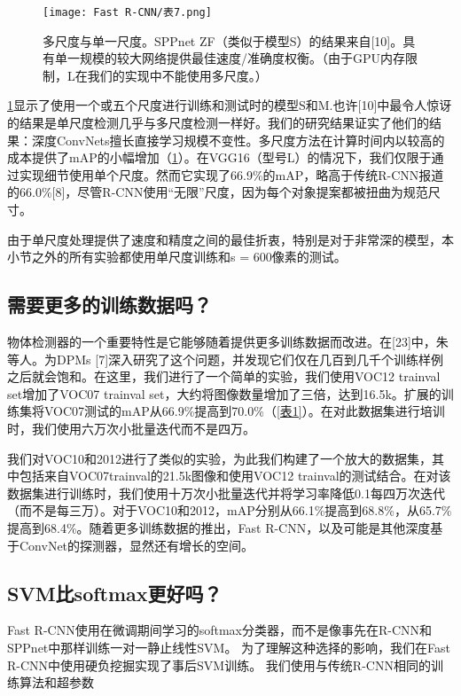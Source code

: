 \begin{figure}[h]
    \centering
    \texttt{[image: Fast R-CNN/表7.png]}
    \caption{多尺度与单一尺度。SPPnet ZF（类似于模型S）的结果来自[10]。具有单一规模的较大网络提供最佳速度/准确度权衡。（由于GPU内存限制，L在我们的实现中不能使用多尺度。）}
    \label{表7}
\end{figure}
\par \ref{表7}显示了使用一个或五个尺度进行训练和测试时的模型S和M.也许[10]中最令人惊讶的结果是单尺度检测几乎与多尺度检测一样好。我们的研究结果证实了他们的结果：深度ConvNets擅长直接学习规模不变性。多尺度方法在计算时间内以较高的成本提供了mAP的小幅增加（\ref{表7}）。在VGG16（型号L）的情况下，我们仅限于通过实现细节使用单个尺度。然而它实现了66.9\%的mAP，略高于传统R-CNN报道的66.0\%[8]，尽管R-CNN使用“无限”尺度，因为每个对象提案都被扭曲为规范尺寸。
\par 由于单尺度处理提供了速度和精度之间的最佳折衷，特别是对于非常深的模型，本小节之外的所有实验都使用单尺度训练和s = 600像素的测试。

\subsection{需要更多的训练数据吗？}
\par 物体检测器的一个重要特性是它能够随着提供更多训练数据而改进。在[23]中，朱等人。为DPMs [7]深入研究了这个问题，并发现它们仅在几百到几千个训练样例之后就会饱和。在这里，我们进行了一个简单的实验，我们使用VOC12 trainval set增加了VOC07 ​​trainval set，大约将图像数量增加了三倍，达到16.5k。扩展的训练集将VOC07测试的mAP从66.9\%提高到70.0\%（\ref{表1}）。在对此数据集进行培训时，我们使用六万次小批量迭代而不是四万。
\par 我们对VOC10和2012进行了类似的实验，为此我们构建了一个放大的数据集，其中包括来自VOC07 ​​trainval的21.5k图像和使用VOC12 trainval的测试结合。在对该数据集进行训练时，我们使用十万次小批量迭代并将学习率降低0.1每四万次迭代（而不是每三万）。对于VOC10和2012，mAP分别从66.1\%提高到68.8\%，从65.7\%提高到68.4\%。随着更多训练数据的推出，Fast R-CNN，以及可能是其他深度基于ConvNet的探测器，显然还有增长的空间。

\subsection{SVM比softmax更好吗？}
\par Fast R-CNN使用在微调期间学习的softmax分类器，而不是像事先在R-CNN和SPPnet中那样训练一对一静止线性SVM。 为了理解这种选择的影响，我们在Fast R-CNN中使用硬负挖掘实现了事后SVM训练。 我们使用与传统R-CNN相同的训练算法和超参数


